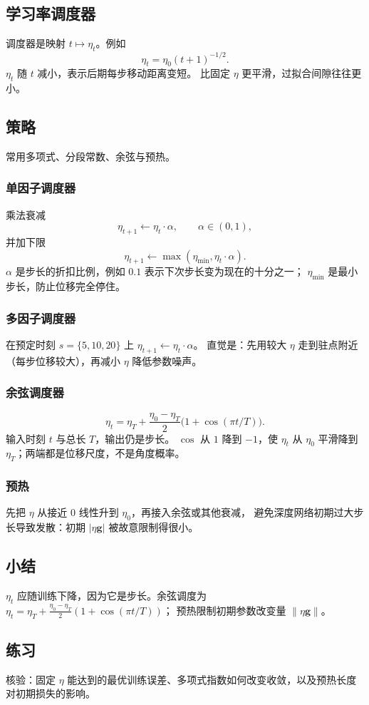\subsection{学习率调度器}

调度器是映射 $t\mapsto\eta_t$。例如
\[
\eta_t=\eta_0(t+1)^{-1/2}.
\]
$\eta_t$ 随 $t$ 减小，表示后期每步移动距离变短。
比固定 $\eta$ 更平滑，过拟合间隙往往更小。

\subsection{策略}

常用多项式、分段常数、余弦与预热。

\subsubsection{单因子调度器}

乘法衰减
\[
\eta_{t+1}\leftarrow\eta_t\cdot\alpha,\qquad\alpha\in(0,1),
\]
并加下限
\[
\eta_{t+1}\leftarrow\max(\eta_{\min},\eta_t\cdot\alpha).
\]
$\alpha$ 是步长的折扣比例，例如 $0.1$ 表示下次步长变为现在的十分之一；
$\eta_{\min}$ 是最小步长，防止位移完全停住。

\subsubsection{多因子调度器}

在预定时刻 $s=\{5,10,20\}$ 上
$\eta_{t+1}\leftarrow\eta_t\cdot\alpha$。
直觉是：先用较大 $\eta$ 走到驻点附近（每步位移较大），再减小 $\eta$ 降低参数噪声。

\subsubsection{余弦调度器}

\[
\eta_t
=
\eta_T+\frac{\eta_0-\eta_T}{2}\bigl(1+\cos(\pi t/T)\bigr).
\]
输入时刻 $t$ 与总长 $T$，输出仍是步长。
$\cos$ 从 $1$ 降到 $-1$，使 $\eta_t$ 从 $\eta_0$ 平滑降到 $\eta_T$；两端都是位移尺度，不是角度概率。

\subsubsection{预热}

先把 $\eta$ 从接近 $0$ 线性升到 $\eta_0$，再接入余弦或其他衰减，
避免深度网络初期过大步长导致发散：初期 $|\eta\bm{g}|$ 被故意限制得很小。

\subsection{小结}

$\eta_t$ 应随训练下降，因为它是步长。余弦调度为
$\eta_t=\eta_T+\frac{\eta_0-\eta_T}{2}(1+\cos(\pi t/T))$；
预热限制初期参数改变量 $\|\eta\bm{g}\|$。

\subsection{练习}

核验：固定 $\eta$ 能达到的最优训练误差、多项式指数如何改变收敛，以及预热长度对初期损失的影响。
